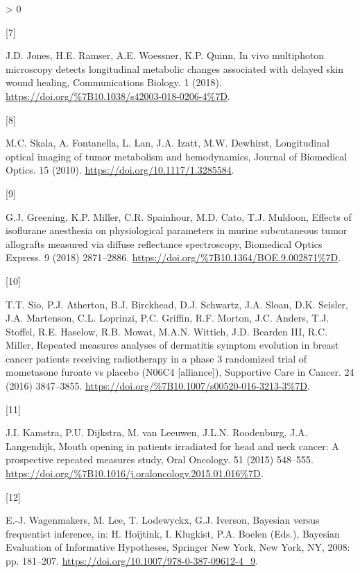 \documentclass[
]{article}
\newlength{\cslhangindent}
\newlength{\csllabelwidth}
\newenvironment{CSLReferences}[2] %
 {%
  \setlength{\parindent}{0pt}
  \ifodd #1 \everypar{\setlength{\hangindent}{\cslhangindent}}\ignorespaces\fi
  \ifnum #2 > 0
  \setlength{\parskip}{#2\baselineskip}
  \fi
 }%
 {}
\newcommand{\CSLLeftMargin}[1]{\parbox[t]{\csllabelwidth}{#1}}
\newcommand{\CSLRightInline}[1]{\parbox[t]{\linewidth - \csllabelwidth}{#1}\break}
\begin{document}
\begin{CSLReferences}{0}{0}
\leavevmode\hypertarget{ref-jones2018}{}%
\CSLLeftMargin{{[}7{]} }
\CSLRightInline{J.D. Jones, H.E. Ramser, A.E. Woessner, K.P. Quinn, {In vivo multiphoton microscopy detects longitudinal metabolic changes associated with delayed skin wound healing}, {Communications Biology}. {1} (2018). \url{https://doi.org/\%7B10.1038/s42003-018-0206-4\%7D}.}

\leavevmode\hypertarget{ref-skala2010}{}%
\CSLLeftMargin{{[}8{]} }
\CSLRightInline{M.C. Skala, A. Fontanella, L. Lan, J.A. Izatt, M.W. Dewhirst, Longitudinal optical imaging of tumor metabolism and hemodynamics, Journal of Biomedical Optics. 15 (2010). \url{https://doi.org/10.1117/1.3285584}.}

\leavevmode\hypertarget{ref-greening2018}{}%
\CSLLeftMargin{{[}9{]} }
\CSLRightInline{G.J. Greening, K.P. Miller, C.R. Spainhour, M.D. Cato, T.J. Muldoon, {Effects of isoflurane anesthesia on physiological parameters in murine subcutaneous tumor allografts measured via diffuse reflectance spectroscopy}, {Biomedical Optics Express}. {9} (2018) 2871--2886. \url{https://doi.org/\%7B10.1364/BOE.9.002871\%7D}.}

\leavevmode\hypertarget{ref-sio2016}{}%
\CSLLeftMargin{{[}10{]} }
\CSLRightInline{T.T. Sio, P.J. Atherton, B.J. Birckhead, D.J. Schwartz, J.A. Sloan, D.K. Seisler, J.A. Martenson, C.L. Loprinzi, P.C. Griffin, R.F. Morton, J.C. Anders, T.J. Stoffel, R.E. Haselow, R.B. Mowat, M.A.N. Wittich, J.D. Bearden III, R.C. Miller, {Repeated measures analyses of dermatitis symptom evolution in breast cancer patients receiving radiotherapy in a phase 3 randomized trial of mometasone furoate vs placebo (N06C4 {{[}}alliance{]})}, {Supportive Care in Cancer}. {24} (2016) 3847--3855. \url{https://doi.org/\%7B10.1007/s00520-016-3213-3\%7D}.}

\leavevmode\hypertarget{ref-kamstra2015}{}%
\CSLLeftMargin{{[}11{]} }
\CSLRightInline{J.I. Kamstra, P.U. Dijkstra, M. van Leeuwen, J.L.N. Roodenburg, J.A. Langendijk, {Mouth opening in patients irradiated for head and neck cancer: A prospective repeated measures study}, {Oral Oncology}. {51} (2015) 548--555. \url{https://doi.org/\%7B10.1016/j.oraloncology.2015.01.016\%7D}.}

\leavevmode\hypertarget{ref-wagenmakers2008}{}%
\CSLLeftMargin{{[}12{]} }
\CSLRightInline{E.-J. Wagenmakers, M. Lee, T. Lodewyckx, G.J. Iverson, Bayesian versus frequentist inference, in: H. Hoijtink, I. Klugkist, P.A. Boelen (Eds.), Bayesian Evaluation of Informative Hypotheses, Springer New York, New York, NY, 2008: pp. 181--207. \url{https://doi.org/10.1007/978-0-387-09612-4_9}.}


\end{CSLReferences}
\end{document}
